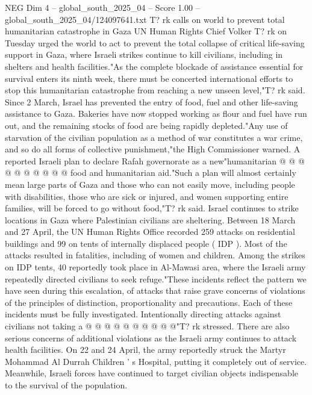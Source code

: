 \begin{textsample}{NEG Dim 4 – global\_south\_2025\_04 – Score 1.00 – global\_south\_2025\_04/124097641.txt}  \label{ex:f4_neg_212}
T? rk calls on world to prevent total humanitarian catastrophe in Gaza UN Human Rights Chief Volker T? rk on Tuesday urged the world to act to prevent the total collapse of critical life-saving support in Gaza, where Israeli strikes continue to kill civilians, including in shelters and health facilities."As the complete blockade of assistance essential for survival enters its ninth week, there must be concerted international efforts to stop this humanitarian catastrophe from reaching a new unseen level,"T? rk said.
Since 2 March, Israel has prevented the entry of food, fuel and other life-saving assistance to Gaza.
Bakeries have now stopped working as flour and fuel have run out, and the remaining stocks of food are being rapidly depleted."Any use of starvation of the civilian population as a method of war constitutes a war crime, and so do all forms of collective punishment,"the High Commissioner warned.
A reported Israeli plan to declare Rafah governorate as a new"humanitarian @ @ @ @ @ @ @ @ @ @ food and humanitarian aid."Such a plan will almost certainly mean large parts of Gaza and those who can not easily move, including people with disabilities, those who are sick or injured, and women supporting entire families, will be forced to go without food,"T? rk said.
Israel continues to strike locations in Gaza where Palestinian civilians are sheltering.
Between 18 March and 27 April, the UN Human Rights Office recorded 259 attacks on residential buildings and 99 on tents of internally displaced people ( IDP ).
Most of the attacks resulted in fatalities, including of women and children.
Among the strikes on IDP tents, 40 reportedly took place in Al-Mawasi area, where the Israeli army repeatedly directed civilians to seek refuge."These incidents reflect the pattern we have seen during this escalation, of attacks that raise grave concerns of violations of the principles of distinction, proportionality and precautions.
Each of these incidents must be fully investigated.
Intentionally directing attacks against civilians not taking a @ @ @ @ @ @ @ @ @ @"T? rk stressed.
There are also serious concerns of additional violations as the Israeli army continues to attack health facilities.
On 22 and 24 April, the army reportedly struck the Martyr Mohammad Al Durrah Children ' s Hospital, putting it completely out of service.
Meanwhile, Israeli forces have continued to target civilian objects indispensable to the survival of the population.

\end{textsample}
